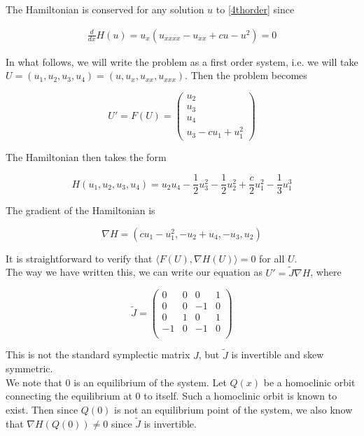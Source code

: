\documentclass[12pt]{article}
\begin{document}
The Hamiltonian is conserved for any solution $u$ to \eqref{4thorder} since

\begin{align*}
\frac{d}{dx}H(u) = u_x(u_{xxxx} - u_{xx} + c u - u^2) = 0
\end{align*}

In what follows, we will write the problem as a first order system, i.e. we will take $U = (u_1, u_2, u_3, u_4) = (u, u_x, u_{xx}, u_{xxx})$. Then the problem becomes

\begin{equation}\label{4thordersystem}
U' = F(U) = \begin{pmatrix} 
u_2 \\ u_3 \\ u_4 \\ u_3 - c u_1 + u_1^2
\end{pmatrix}
\end{equation}

The Hamiltonian then takes the form

\begin{equation}
H(u_1, u_2, u_3, u_4) = u_2 u_4 - \frac{1}{2}u_3^2 - \frac{1}{2}u_2^2 + \frac{c}{2}u_1^2 - \frac{1}{3}u_1^3
\end{equation}

The gradient of the Hamiltonian is

\begin{equation}
\nabla H = (cu_1 - u_1^2, -u_2 + u_4, -u_3, u_2)
\end{equation}

It is straightforward to verify that $\langle F(U), \nabla H(U) \rangle = 0$ for all $U$.\\

The way we have written this, we can write our equation as $U' = \tilde{J} \nabla H$, where

\[
\tilde{J} = \begin{pmatrix}
0 & 0 & 0 & 1 \\
0 & 0 & -1 & 0 \\
0 & 1 & 0 & 1 \\
-1 & 0 & -1 & 0 \\
\end{pmatrix}
\]

This is not the standard symplectic matrix $J$, but $\tilde{J}$ is invertible and skew symmetric. \\

We note that 0 is an equilibrium of the system. Let $Q(x)$ be a homoclinic orbit connecting the equilibrium at 0 to itself. Such a homoclinic orbit is known to exist. Then since $Q(0)$ is not an equilibrium point of the system, we also know that $\nabla H(Q(0)) \neq 0$ since $\tilde{J}$ is invertible.
\end{document}
